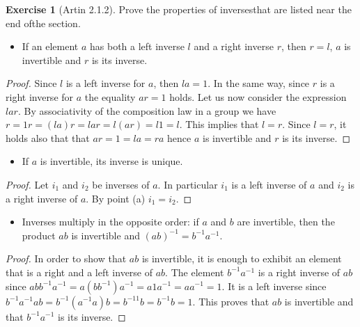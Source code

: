 \documentclass[
]{book}
\providecommand{\tightlist}{%
  \setlength{\itemsep}{0pt}\setlength{\parskip}{0pt}}
\theoremstyle{definition}
\theoremstyle{definition}
\theoremstyle{definition}
\newtheorem{exercise}{Exercise}[chapter]
\theoremstyle{definition}
\theoremstyle{remark}
\begin{document}
\begin{exercise}[Artin 2.1.2]
\protect\hypertarget{exr:unnamed-chunk-79}{}\label{exr:unnamed-chunk-79}Prove the properties of inversesthat are listed near the end ofthe section.
\end{exercise}

\begin{itemize}
\tightlist
\item
  If an element \(a\) has both a left inverse \(l\) and a right inverse \(r\), then \(r = l\), \(a\) is invertible and \(r\) is its inverse.
\end{itemize}

\begin{proof}
Since \(l\) is a left inverse for \(a\), then \(la = 1\). In the same way, since \(r\) is a right inverse for \(a\) the equality \(ar = 1\) holds. Let us now consider the expression \(lar\). By associativity of the composition law in a group we have \(r = 1r = (la)r = lar = l(ar) = l1 = l\). This implies that \(l = r\). Since \(l = r\), it holds also that that \(ar = 1 = la = ra\) hence \(a\) is invertible and \(r\) is its inverse.
\end{proof}

\begin{itemize}
\tightlist
\item
  If \(a\) is invertible, its inverse is unique.
\end{itemize}

\begin{proof}
Let \(i_1\) and \(i_2\) be inverses of \(a\). In particular \(i_1\) is a left inverse of \(a\) and \(i_2\) is a right inverse of \(a\). By point (a) \(i_1 = i_2\).
\end{proof}

\begin{itemize}
\tightlist
\item
  Inverses multiply in the opposite order: if \(a\) and \(b\) are invertible, then the product \(ab\) is invertible and \((ab)^{-1} = b^{-1}a^{-1}\).
\end{itemize}

\begin{proof}
In order to show that \(ab\) is invertible, it is enough to exhibit an element that is a right and a left inverse of \(ab\). The element \(b^{-1}a^{-1}\) is a right inverse of \(ab\) since \(abb^{-1}a^{-1} = a(bb^{-1})a^{-1} = a1a^{-1} = aa^{-1} = 1\). It is a left inverse since \(b^{-1}a^{-1}ab = b^{-1}(a^{-1}a)b = b^{-11}b = b^{-1}b = 1\). This proves that \(ab\) is invertible and that \(b^{-1}a^{-1}\) is its inverse.
\end{proof}
\end{document}
